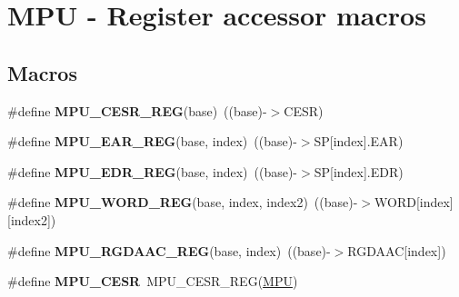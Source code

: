\hypertarget{group__MPU__Register__Accessor__Macros}{}\section{M\+PU -\/ Register accessor macros}
\label{group__MPU__Register__Accessor__Macros}
\subsection*{Macros}
\begin{DoxyCompactItemize}
\item 
\#define {\bfseries M\+P\+U\+\_\+\+C\+E\+S\+R\+\_\+\+R\+EG}(base)~((base)-\/$>$C\+E\+SR)\hypertarget{group__MPU__Register__Accessor__Macros_ga90cec6606b837eae6053c8079f301371}{}\label{group__MPU__Register__Accessor__Macros_ga90cec6606b837eae6053c8079f301371}

\item 
\#define {\bfseries M\+P\+U\+\_\+\+E\+A\+R\+\_\+\+R\+EG}(base,  index)~((base)-\/$>$SP\mbox{[}index\mbox{]}.E\+AR)\hypertarget{group__MPU__Register__Accessor__Macros_ga4e7ea42772044db4055c2d6352cbdfcd}{}\label{group__MPU__Register__Accessor__Macros_ga4e7ea42772044db4055c2d6352cbdfcd}

\item 
\#define {\bfseries M\+P\+U\+\_\+\+E\+D\+R\+\_\+\+R\+EG}(base,  index)~((base)-\/$>$SP\mbox{[}index\mbox{]}.E\+DR)\hypertarget{group__MPU__Register__Accessor__Macros_ga65449f7488a8b69617758276f4dfdd1f}{}\label{group__MPU__Register__Accessor__Macros_ga65449f7488a8b69617758276f4dfdd1f}

\item 
\#define {\bfseries M\+P\+U\+\_\+\+W\+O\+R\+D\+\_\+\+R\+EG}(base,  index,  index2)~((base)-\/$>$W\+O\+RD\mbox{[}index\mbox{]}\mbox{[}index2\mbox{]})\hypertarget{group__MPU__Register__Accessor__Macros_ga841d3d7b915f9249607308b910b5e292}{}\label{group__MPU__Register__Accessor__Macros_ga841d3d7b915f9249607308b910b5e292}

\item 
\#define {\bfseries M\+P\+U\+\_\+\+R\+G\+D\+A\+A\+C\+\_\+\+R\+EG}(base,  index)~((base)-\/$>$R\+G\+D\+A\+AC\mbox{[}index\mbox{]})\hypertarget{group__MPU__Register__Accessor__Macros_ga1aab06cc90139a4e8e69ef29d984f1c9}{}\label{group__MPU__Register__Accessor__Macros_ga1aab06cc90139a4e8e69ef29d984f1c9}

\item 
\#define {\bfseries M\+P\+U\+\_\+\+C\+E\+SR}~M\+P\+U\+\_\+\+C\+E\+S\+R\+\_\+\+R\+EG(\hyperlink{group__MPU__Peripheral__Access__Layer_gaad8182e72fe5037a6ba1eb65a1554e0b}{M\+PU})\hypertarget{group__MPU__Register__Accessor__Macros_ga4acb3e496c40cc58cf9aa69ad7696550}{}\label{group__MPU__Register__Accessor__Macros_ga4acb3e496c40cc58cf9aa69ad7696550}


\end{DoxyCompactItemize}
